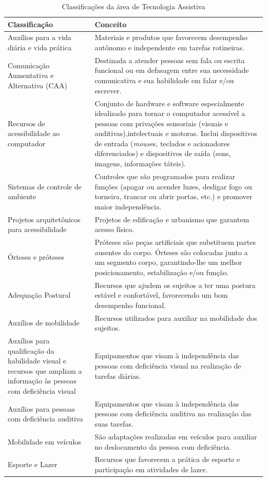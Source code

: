 \documentclass[
	12pt,			%
	openright,		%
	oneside,			%
	a4paper,			%
	chapter=TITLE,		%
	english,			%
	brazil,			%
	]{abntex2}
\begin{document}
\begin{table}[H]
\caption{Classificações da área de Tecnologia Assistiva}
\label{tab:tab-1}
{
\centering
\footnotesize
\begin{tabular}{|p{7cm}|p{8cm}|}
\hline
\textbf{Classificação} & \textbf{Conceito} \\
\hline
Auxílios para a vida diária e vida prática & Materiais e produtos que favorecem desempenho autônomo e independente em tarefas rotineiras.\\
\hline
Comunicação Aumentativa e Alternativa (CAA) & Destinada a atender pessoas sem fala ou escrita funcional ou em defasagem entre sua necessidade comunicativa e sua habilidade em falar e/ou escrever.\\
\hline
Recursos de acessibilidade ao computador & Conjunto de hardware e software especialmente idealizado para tornar o computador acessível a pessoas com privações sensoriais (visuais e auditivas),intelectuais e motoras. Inclui dispositivos de entrada (\emph{mouse}s, teclados e acionadores diferenciados) e dispositivos de saída (sons, imagens, informações táteis).\\
\hline
Sistemas de controle de ambiente & Controles que são programados para realizar funções (apagar ou acender luzes, desligar fogo ou torneira, trancar ou abrir portas, etc.) e promover maior independência.\\
\hline
Projetos arquitetônicos para acessibilidade & Projetos de edificação e urbanismo que garantem acesso físico.\\
\hline
Órteses e próteses & Próteses são peças artificiais que substituem partes ausentes do corpo. Órteses são colocadas junto a um segmento corpo, garantindo-lhe um melhor posicionamento, estabilização e/ou função.\\
\hline
Adequação Postural & Recursos que ajudem os sujeitos a ter uma postura estável e confortável, favorecendo um bom desempenho funcional.\\
\hline
Auxílios de mobilidade & Recursos utilizados para auxiliar na mobilidade dos sujeitos.\\
\hline
Auxílios para qualificação da habilidade visual e recursos que ampliam a informação às pessoas com deficiência visual & Equipamentos que visam à independência das pessoas com deficiência visual na realização de tarefas diárias.\\
\hline
Auxílios para pessoas com deficiência auditiva & Equipamentos que visam à independência das pessoas com deficiência auditiva na realização das suas tarefas.\\
\hline
Mobilidade em veículos & São adaptações realizadas em veículos para auxiliar no deslocamento da pessoa com deficiência.\\
\hline
Esporte e Lazer & Recursos que favorecem a prática de esporte e participação em atividades de lazer.\\
\hline
\end{tabular}
}
\end{table}
\end{document}
